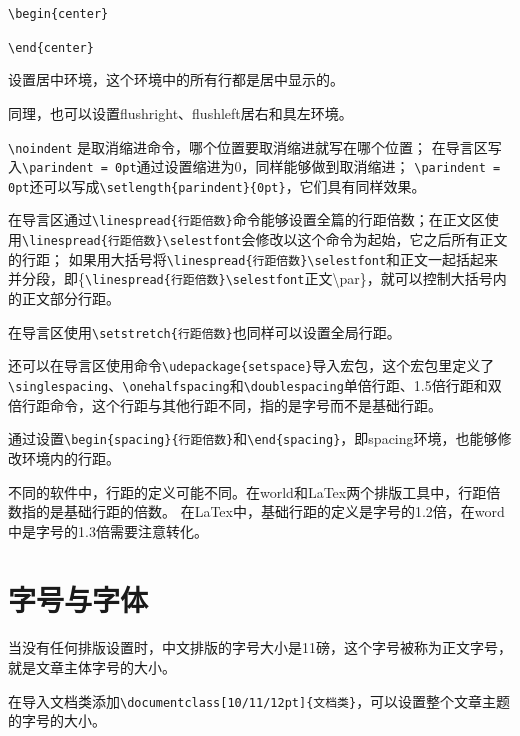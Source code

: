 \documentclass[12pt,a4paper]{ctexart}
\begin{document}
\texttt{\textbackslash begin\{center\}}

\texttt{\textbackslash end\{center\}}

设置居中环境，这个环境中的所有行都是居中显示的。

同理，也可以设置flushright、flushleft居右和具左环境。

\vspace*{\baselineskip}

\texttt{\textbackslash noindent} 是取消缩进命令，哪个位置要取消缩进就写在哪个位置；
在导言区写入\texttt{\textbackslash parindent = 0pt}通过设置缩进为0，同样能够做到取消缩进；
\texttt{\textbackslash parindent = 0pt}还可以写成\texttt{\textbackslash setlength\{parindent\}\{0pt\}}，它们具有同样效果。

\vspace*{\baselineskip}

在导言区通过\texttt{\textbackslash linespread\{行距倍数\}}命令能够设置全篇的行距倍数；在正文区使用\texttt{\textbackslash linespread\{行距倍数\}}\texttt{\textbackslash selestfont}会修改以这个命令为起始，它之后所有正文的行距；
如果用大括号将\texttt{\textbackslash linespread\{行距倍数\}}\texttt{\textbackslash selestfont}和正文一起括起来并分段，即\{\texttt{\textbackslash linespread\{行距倍数\}}\texttt{\textbackslash selestfont}正文\textbackslash par\}，就可以控制大括号内的正文部分行距。

在导言区使用\texttt{\textbackslash setstretch\{行距倍数\}}也同样可以设置全局行距。

还可以在导言区使用命令\texttt{\textbackslash udepackage\{setspace\}}导入宏包，这个宏包里定义了\texttt{\textbackslash singlespacing}、\texttt{\textbackslash onehalfspacing}和\texttt{\textbackslash doublespacing}单倍行距、1.5倍行距和双倍行距命令，这个行距与其他行距不同，指的是字号而不是基础行距。

通过设置\texttt{\textbackslash begin\{spacing\}\{行距倍数\}}和\texttt{\textbackslash end\{spacing\}}，即spacing环境，也能够修改环境内的行距。

不同的软件中，行距的定义可能不同。在world和LaTex两个排版工具中，行距倍数指的是基础行距的倍数。
在LaTex中，基础行距的定义是字号的1.2倍，在word中是字号的1.3倍需要注意转化。


\section{字号与字体}
当没有任何排版设置时，中文排版的字号大小是11磅，这个字号被称为正文字号，就是文章主体字号的大小。

在导入文档类添加\texttt{\textbackslash documentclass[10/11/12pt]\{文档类\}}，可以设置整个文章主题的字号的大小。
\end{document}
